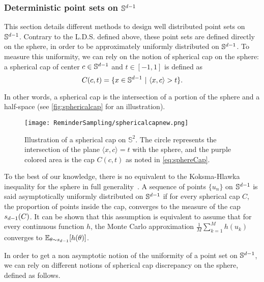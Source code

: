 \subsubsection{Deterministic point sets on $\mathbb{S}^{d-1}$} \label{sec:QMCSphere}

This section details different methods to design well distributed point sets on $\mathbb{S}^{d-1}$. Contrary to the L.D.S. defined above,  these point sets are defined directly on the sphere, in order to be approximately uniformly distributed on $\mathbb{S}^{d-1}$. To measure this uniformity, we can rely on the notion of spherical cap on the sphere: a spherical cap of center $c\in\mathbb{S}^{d-1}$ and $t\in [-1,1]$ is defined as
\begin{equation}
C(c,t) = \{ x \in \Sd\ | \ \langle x , c \rangle > t\}.
\end{equation}\label{eq:sphereCap}

In other words, a spherical cap is the intersection of a portion of the sphere and a half-space (see \autoref{fig:sphericalcap} for an illustration). 
\begin{figure}[!h]
\begin{center}
\texttt{[image: ReminderSampling/sphericalcapnew.png]}
\caption{Illustration of a spherical cap on $\mathbb{S}^2$. The circle represents the intersection of the plane $\langle x, c \rangle = t$ with the sphere, and the purple colored area is the cap $C(c,t)$ as noted in \autoref{eq:sphereCap}.}
\label{fig:sphericalcap}
\end{center}
\end{figure}


To the best of our knowledge, there is no equivalent to the Koksma-Hlawka inequality for the sphere in full generality~\citep{brauchart2011optimal}. 
A sequence of points $\{u_n\}$ on $\mathbb{S}^{d-1}$ is said asymptotically uniformly distributed on $\mathbb{S}^{d-1}$ if for every spherical cap $C$, the proportion of points inside the cap, converges to the measure of the cap $s_{d-1}(C)$. It can be shown that this assumption is equivalent to assume that for every continuous function $h$, the Monte Carlo approximation $\frac 1 M \sum_{k=1}^M h(u_k)$ converges to $\mathbb{E}_{\theta \sim s_{d-1}}[h(\theta)]$. 

In order to get a non asymptotic notion of the uniformity of a point set on $\mathbb{S}^{d-1}$, we can rely on different notions of spherical cap discrepancy on the sphere, defined as follows.


